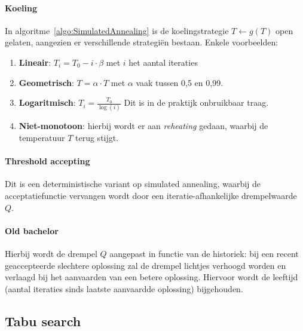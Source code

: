 \paragraph{Koeling}
In algoritme~\ref{algo:SimulatedAnnealing} is de koelingstrategie $T \gets g(T)$ open gelaten, aangezien er verschillende strategi\"en bestaan. 
Enkele voorbeelden:

\begin{enumerate}
    \item \textbf{Lineair}: $T_i = T_0 - i \cdot \beta$ met $i$ het aantal iteraties
    \item \textbf{Geometrisch}: $T = \alpha \cdot T$ met $\alpha$ vaak tussen 0,5 en 0,99.
    \item \textbf{Logaritmisch}: $T_i = \frac{T_0}{\log(i)}$ Dit is in de praktijk onbruikbaar traag.
    \item \textbf{Niet-monotoon}: hierbij wordt er aan \emph{reheating} gedaan, waarbij de temperatuur $T$ terug stijgt.
\end{enumerate}


\paragraph{Threshold accepting}
Dit is een deterministische variant op simulated annealing, waarbij de acceptatiefunctie vervangen wordt door een iteratie-afhankelijke drempelwaarde $Q$.

\paragraph{Old bachelor}
Hierbij wordt de drempel $Q$ aangepast in functie van de historiek: bij een recent geaccepteerde slechtere oplossing zal de drempel lichtjes verhoogd worden en verlaagd bij het aanvaarden van een betere oplossing. Hiervoor wordt de leeftijd (aantal iteraties sinds laatste aanvaardde oplossing) bijgehouden.

\subsection{Tabu search}